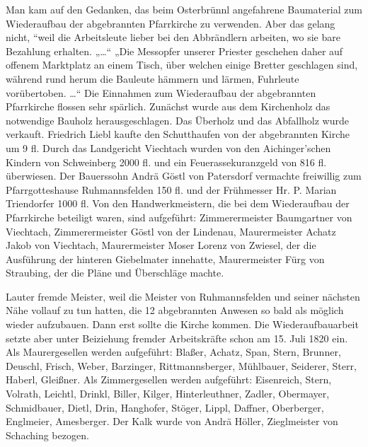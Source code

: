 \documentclass[12pt,a4paper]{book}
\begin{document}
Man kam auf den Gedanken, das beim Osterbrünnl angefahrene Baumaterial
zum Wiederaufbau der abgebrannten Pfarrkirche zu verwenden. Aber das
gelang nicht, “weil die Arbeitsleute lieber bei den Abbrändlern
arbeiten, wo sie bare Bezahlung erhalten. „…“ „Die Messopfer unserer
Priester geschehen daher auf offenem Marktplatz an einem Tisch, über
welchen einige Bretter geschlagen sind, während rund herum die Bauleute
hämmern und lärmen, Fuhrleute vorübertoben. …“ Die Einnahmen zum
Wiederaufbau der abgebrannten Pfarrkirche flossen sehr spärlich.
Zunächst wurde aus dem Kirchenholz das notwendige Bauholz
herausgeschlagen. Das Überholz und das Abfallholz wurde verkauft.
Friedrich Liebl kaufte den Schutthaufen von der abgebrannten Kirche um 9
fl. Durch das Landgericht Viechtach wurden von den Aichinger'schen
Kindern von Schweinberg 2000 fl. und ein Feuerassekuranzgeld von 816 fl.
überwiesen. Der Bauerssohn Andrä Göstl von Patersdorf vermachte
freiwillig zum Pfarrgotteshause Ruhmannsfelden 150 fl. und der
Frühmesser Hr. P. Marian Triendorfer 1000 fl. Von den Handwerkmeistern,
die bei dem Wiederaufbau der Pfarrkirche beteiligt waren, sind
aufgeführt: Zimmerermeister Baumgartner von Viechtach, Zimmerermeister
Göstl von der Lindenau, Maurermeister Achatz Jakob von Viechtach,
Maurermeister Moser Lorenz von Zwiesel, der die Ausführung der hinteren
Giebelmater innehatte, Maurermeister Fürg von Straubing, der die Pläne
und Überschläge machte.

Lauter fremde Meister, weil die Meister von Ruhmannsfelden und seiner
nächsten Nähe vollauf zu tun hatten, die 12 abgebrannten Anwesen so bald
als möglich wieder aufzubauen. Dann erst sollte die Kirche kommen. Die
Wiederaufbauarbeit setzte aber unter Beiziehung fremder Arbeitskräfte
schon am 15. Juli 1820 ein. Als Maurergesellen werden aufgeführt:
Blaßer, Achatz, Span, Stern, Brunner, Deuschl, Frisch, Weber, Barzinger,
Rittmannsberger, Mühlbauer, Seiderer, Sterr, Haberl, Gleißner. Als
Zimmergesellen werden aufgeführt: Eisenreich, Stern, Volrath, Leichtl,
Drinkl, Biller, Kilger, Hinterleuthner, Zadler, Obermayer, Schmidbauer,
Dietl, Drin, Hanghofer, Stöger, Lippl, Daffner, Oberberger, Englmeier,
Amesberger. Der Kalk wurde von Andrä Höller, Zieglmeister von Schaching
bezogen.
\end{document}
